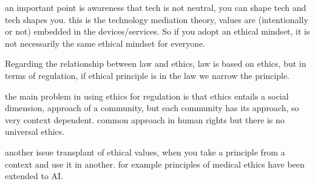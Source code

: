 an important point is awareness that tech is not neutral, you can shape tech and tech shapes you. this is the technology mediation theory, values are (intentionally or not) embedded in the devices/services. So if you adopt an ethical mindset, it is not necessarily the same ethical mindset for everyone.

Regarding the relationship between law and ethics, law is based on ethics, but in terms of regulation, if ethical principle is in the law we narrow the principle.

the main problem in using ethics for regulation is that ethics entails a social dimension, approach of a community, but each community has its approach, so very context dependent. common approach in human rights but there is no universal ethics.

another issue transplant of ethical values, when you take a principle from a context and use it in another. for example principles of medical ethics have been extended to AI.
